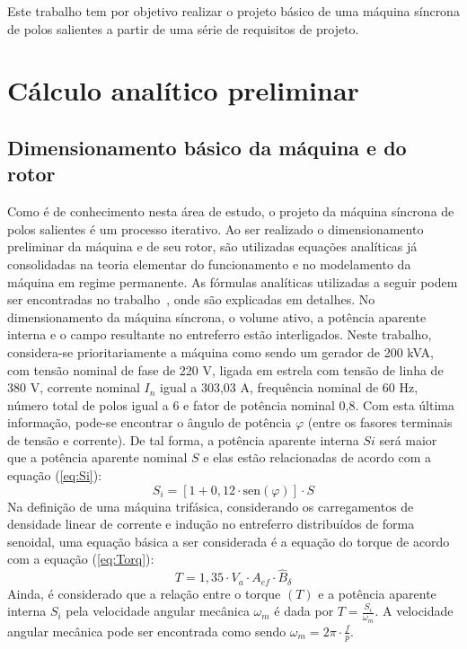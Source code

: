 \documentclass[conference]{IEEEtran}
\begin{document}
Este trabalho tem por objetivo realizar o projeto básico de uma máquina síncrona de polos salientes a partir de uma série de requisitos de projeto.\\
\section{Cálculo analítico preliminar}
\subsection{Dimensionamento básico da máquina e do rotor}
Como é de conhecimento nesta área de estudo, o projeto da máquina síncrona de polos salientes é um processo iterativo. Ao ser realizado o dimensionamento preliminar da máquina e de seu rotor, são utilizadas equações analíticas já consolidadas na teoria elementar do funcionamento e no modelamento da máquina em regime permanente. As fórmulas analíticas utilizadas a seguir podem ser encontradas no trabalho~\cite{b1}, onde são explicadas em detalhes. No dimensionamento da máquina síncrona, o volume ativo, a potência aparente interna e o campo resultante no entreferro estão interligados. Neste trabalho, considera-se prioritariamente a máquina como sendo um gerador de 200 kVA, com tensão nominal de fase de 220 V, ligada em estrela com tensão de linha de 380 V, corrente nominal $I_n$ igual a 303,03 A, frequência nominal de 60 Hz, número total de polos igual a 6 e fator de potência nominal 0,8. Com esta última informação, pode-se encontrar o ângulo de potência $\varphi$ (entre os fasores terminais de tensão e corrente). De tal forma, a potência aparente interna $Si$ será maior que a potência aparente nominal $S$ e elas estão relacionadas de acordo com a equação (\ref{eq:Si}):
\begin{equation}
  S_i = [1 + 0,12 \cdot \text{sen}(\varphi)] \cdot S
\label{eq:Si}
\end{equation}
Na definição de uma máquina trifásica, considerando os carregamentos de densidade linear de corrente e indução no entreferro distribuídos de forma senoidal, uma equação básica a ser considerada é a equação do torque de acordo com a equação (\ref{eq:Torq}):
\begin{equation}
 T = 1,35 \cdot V_a \cdot A_{ef} \cdot \hat{B}_\delta
\label{eq:Torq}
\end{equation}
Ainda, é considerado que a relação entre o torque $(T)$ e a potência aparente interna $S_i$ pela velocidade angular mecânica $\omega_m$ é dada por $T = \frac{S_i}{\omega_m}$. A velocidade angular mecânica pode ser encontrada como sendo $\omega_m = 2\pi \cdot \frac{f}{p}$.
\end{document}
